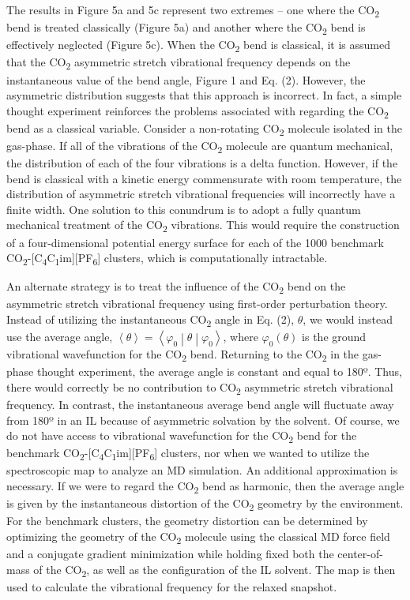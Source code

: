 \documentclass[]{article}
\begin{document}
The results in Figure 5a and 5c represent two extremes -- one where the CO\textsubscript{2} bend is treated classically (Figure 5a) and another where the CO\textsubscript{2} bend is effectively neglected (Figure 5c).  When the CO\textsubscript{2} bend is classical, it is assumed that the CO\textsubscript{2} asymmetric stretch vibrational frequency depends on the instantaneous value of the bend angle, Figure 1 and Eq. (2).  However, the asymmetric distribution suggests that this approach is incorrect. In fact, a simple thought experiment reinforces the problems associated with regarding the CO\textsubscript{2} bend as a classical variable. Consider a non-rotating CO\textsubscript{2} molecule isolated in the gas-phase. If all of the vibrations of the CO\textsubscript{2} molecule are quantum mechanical, the distribution of each of the four vibrations is a delta function. However, if the bend is classical with a kinetic energy commensurate with room temperature, the distribution of asymmetric stretch vibrational frequencies will incorrectly have a finite width. One solution to this conundrum is to adopt a fully quantum mechanical treatment of the CO\textsubscript{2} vibrations. This would require the construction of a four-dimensional potential energy surface for each of the 1000 benchmark CO\textsubscript{2}-{[}C\textsubscript{4}C\textsubscript{1}im{]}{[}PF\textsubscript{6}{]} clusters, which is computationally intractable.

An alternate strategy is to treat the influence of the CO\textsubscript{2} bend on the asymmetric stretch vibrational frequency using first-order perturbation theory. Instead of utilizing the instantaneous CO\textsubscript{2} angle in Eq. (2), \(\theta\), we would instead use the average angle, \(\left\langle \theta \right\rangle = \left\langle \varphi_{0} \middle| \theta \middle| \varphi_{0} \right\rangle\), where \(\varphi_{0}(\theta)\) is the ground vibrational wavefunction for the CO\textsubscript{2} bend. Returning to the CO\textsubscript{2} in the gas-phase thought experiment, the average angle is constant and equal to 180º. Thus, there would correctly be no contribution to CO\textsubscript{2} asymmetric stretch vibrational frequency. In contrast, the instantaneous average bend angle will fluctuate away from 180º in an IL because of asymmetric solvation by the solvent. Of course, we do not have access to vibrational wavefunction for the CO\textsubscript{2} bend for the benchmark CO\textsubscript{2}-{[}C\textsubscript{4}C\textsubscript{1}im{]}{[}PF\textsubscript{6}{]} clusters, nor when we wanted to utilize the spectroscopic map to analyze an MD simulation. An additional approximation is necessary. If we were to regard the CO\textsubscript{2} bend as harmonic, then the average angle is given by the instantaneous distortion of the CO\textsubscript{2} geometry by the environment. For the benchmark clusters, the geometry distortion can be determined by optimizing the geometry of the CO\textsubscript{2} molecule using the classical MD force field and a conjugate gradient minimization while holding fixed both the center-of-mass of the CO\textsubscript{2}, as well as the configuration of the IL solvent. The map is then used to calculate the vibrational frequency for the relaxed snapshot.
\end{document}
